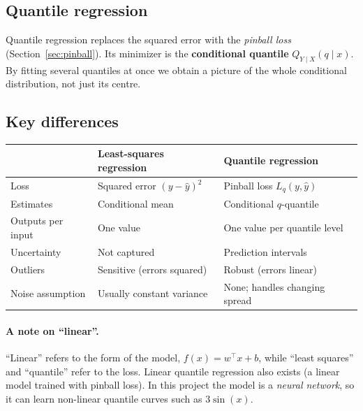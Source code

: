 \documentclass[11pt]{article}
\begin{document}
\subsection{Quantile regression}

Quantile regression replaces the squared error with the \emph{pinball loss}
(Section~\ref{sec:pinball}). Its minimizer is the \textbf{conditional quantile}
$Q_{Y\mid X}(q \mid x)$. By fitting several quantiles at once we obtain a
picture of the whole conditional distribution, not just its centre.

\subsection{Key differences}

\begin{center}
  \begin{tabular}{@{}lll@{}}
    \toprule
                      & \textbf{Least-squares regression} & \textbf{Quantile regression}  \\
    \midrule
    Loss              & Squared error $(y-\hat y)^2$      & Pinball loss $L_q(y,\hat y)$  \\
    Estimates         & Conditional mean                  & Conditional $q$-quantile      \\
    Outputs per input & One value                         & One value per quantile level  \\
    Uncertainty       & Not captured                      & Prediction intervals          \\
    Outliers          & Sensitive (errors squared)        & Robust (errors linear)        \\
    Noise assumption  & Usually constant variance         & None; handles changing spread \\
    \bottomrule
  \end{tabular}
\end{center}

\paragraph{A note on ``linear''.}
``Linear'' refers to the form of the model, $f(x) = w^\top x + b$, while
``least squares'' and ``quantile'' refer to the loss. Linear quantile
regression also exists (a linear model trained with pinball loss). In this
project the model is a \emph{neural network}, so it can learn non-linear
quantile curves such as $3\sin(x)$.
\end{document}
